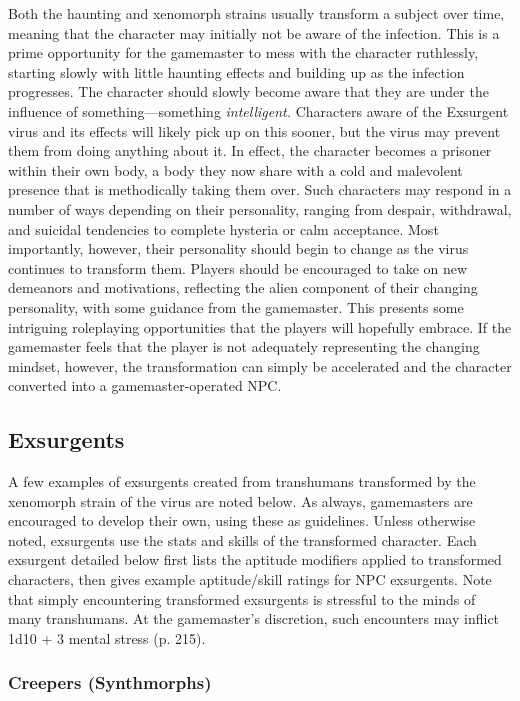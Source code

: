 Both the haunting and xenomorph strains usually 
transform a subject over time, meaning that the 
character may initially not be aware of the infection. 
This is a prime opportunity for the gamemaster to 
mess with the character ruthlessly, starting slowly 
with little haunting effects and building up as the 
infection progresses. The character should slowly 
become aware that they are under the influence of 
something—something \textit{intelligent.} Characters aware 
of the Exsurgent virus and its effects will likely pick 
up on this sooner, but the virus may prevent them 
from doing anything about it. In effect, the character 
becomes a prisoner within their own body, a body 
they now share with a cold and malevolent presence
that is methodically taking them over. Such
characters may respond in a number of ways depending
on their personality, ranging from despair,
withdrawal, and suicidal tendencies to complete 
hysteria or calm acceptance. Most importantly, 
however, their personality should begin to change 
as the virus continues to transform them. Players 
should be encouraged to take on new demeanors 
and motivations, reflecting the alien component 
of their changing personality, with some guidance 
from the gamemaster. This presents some intriguing
roleplaying opportunities that the players will
hopefully embrace. If the gamemaster feels that the 
player is not adequately representing the changing 
mindset, however, the transformation can simply 
be accelerated and the character converted into a 
gamemaster-operated NPC. 

\subsection{Exsurgents }

A few examples of exsurgents created from transhumans
transformed by the xenomorph strain of
the virus are noted below. As always, gamemasters 
are encouraged to develop their own, using these as 
guidelines. Unless otherwise noted, exsurgents use the 
stats and skills of the transformed character. Each exsurgent
detailed below first lists the aptitude modifiers
applied to transformed characters, then gives example 
aptitude/skill ratings for NPC exsurgents.
Note that simply encountering transformed exsurgents
is stressful to the minds of many transhumans.
At the gamemaster's discretion, such encounters may 
inflict 1d10 + 3 mental stress (p. 215).

\subsubsection{Creepers (Synthmorphs)}

